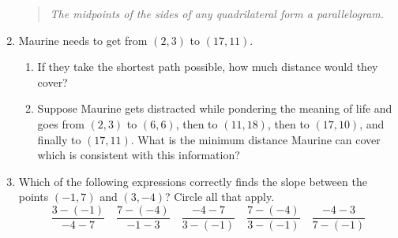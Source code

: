\documentclass{article}
\begin{document}
\begin{enumerate}
\begin{quote}
\textit{The midpoints of the sides of any quadrilateral form a parallelogram.}
\end{quote}
\item Maurine needs to get from $(2,3)$ to $(17,11)$.
\begin{enumerate}
\item If they take the shortest path possible, how much distance would they cover?
\item Suppose Maurine gets distracted while pondering the meaning of life and goes from $(2,3)$ to $(6,6)$, then to $(11, 18)$, then to $(17,10)$, and finally to $(17,11)$. What is the minimum distance Maurine can cover which is consistent with this information? 
\end{enumerate}
\item Which of the following expressions correctly finds the slope between the points $(-1,7)$ and $(3,-4)$? Circle all that apply.
\begin{equation*}
\frac{3 - (-1)}{-4 - 7}\quad\frac{7 - (-4)}{-1 - 3}\quad\frac{-4 - 7}{3 - (-1)}\quad\frac{7 - (-4)}{3 - (-1)}\quad\frac{-4 - 3}{7 - (-1)}
\end{equation*}






\end{enumerate}
\end{document}
